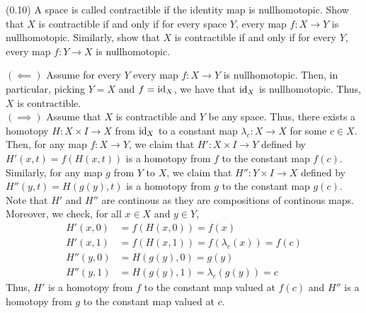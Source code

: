 \documentclass[12pt]{article}
\begin{document}

\begin{problab}{1}
(0.10) A space is called contractible if the identity map is nullhomotopic. Show that \( X \) is contractible if and only if for every space \( Y \), every map \( f : X \to Y \) is nullhomotopic. Similarly, show that \( X \) is contractible if and only if for every \( Y \), every map \( f : Y \to X \) is nullhomotopic.
\end{problab}
\begin{solu}
    $(\impliedby)$ Assume for every $Y$ every map $f : X \to Y$ is nullhomotopic. Then, in particular, picking $Y = X$ and $f = \operatorname{id}_X$, we have that $\operatorname{id}_X$ is nullhomotopic. Thus, $X$ is contractible. \\
    $(\implies)$ Assume that $X$ is contractible and $Y$ be any space. Thus, there exists a homotopy $H: X \times I \to X$ from $\operatorname{id}_X$ to a constant map $\lambda_c : X \to X$ for some $c \in X$. Then, for any map $f : X \to Y$, we claim that $H': X \times I \to Y$ defined by $H'(x, t) = f(H(x, t))$ is a homotopy from $f$ to the constant map $f(c)$. Similarly, for any map $g$ from $Y$ to $X$, we claim that $H'': Y \times I \to X$ defined by $H''(y, t) = H(g(y), t)$ is a homotopy from $g$ to the constant map $g(c)$. Note that $H'$ and $H''$ are continous as they are compositions of continous maps. Moreover, we check, for all $x \in X$ and $y \in Y$,
    \begin{align*}
        H'(x, 0) &= f(H(x, 0)) = f(x) \\
        H'(x, 1) &= f(H(x, 1)) = f(\lambda_c(x)) = f(c) \\
        H''(y, 0) &= H(g(y), 0) = g(y) \\
        H''(y, 1) &= H(g(y), 1) = \lambda_c(g(y)) = c
    \end{align*}
    Thus, $H'$ is a homotopy from $f$ to the constant map valued at $f(c)$ and $H''$ is a homotopy from $g$ to the constant map valued at $c$.
\end{solu}
\newpage
\end{document}
